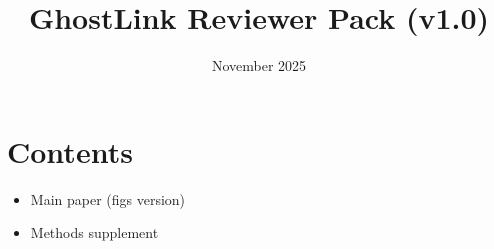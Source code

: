 \documentclass[11pt]{article}
\title{GhostLink Reviewer Pack (v1.0)}
\date{November 2025}
\begin{document}
\maketitle
\section*{Contents}
\begin{itemize}
  \item Main paper (figs version)
  \item Methods supplement
\end{itemize}
\newpage


\end{document}
